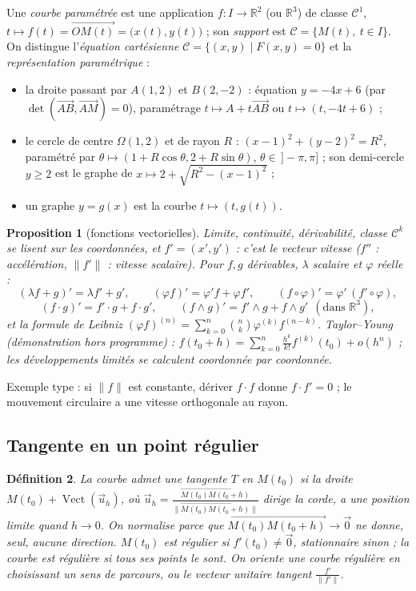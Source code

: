 \documentclass[a4paper,11pt]{article}
\numberwithin{equation}{section}
\numberwithin{figure}{section}
\numberwithin{table}{section}
\theoremstyle{enonce}
\newtheorem{definition}{Définition}[section]
\newtheorem{proposition}[definition]{Proposition}
\theoremstyle{exemple}
\theoremstyle{remarque}
\newcommand{\R}{\mathbb{R}}
\newcommand{\vect}{\operatorname{Vect}}
\newcommand{\vv}[1]{\overrightarrow{#1}}
\newcommand{\ve}[1]{\vec{#1}}
\begin{document}
Une \emph{courbe paramétrée} est une application $f:I\to\R^2$ (ou $\R^3$) de classe $\mathcal C^1$,
$t\mapsto f(t)=\vv{OM(t)}=\big(x(t),y(t)\big)$ ; son \emph{support} est $\mathcal C=\{M(t),\ t\in I\}$. On distingue
l'\emph{équation cartésienne} $\mathcal C=\{(x,y)\mid F(x,y)=0\}$ et la \emph{représentation paramétrique} :
\begin{itemize}
\item la droite passant par $A(1,2)$ et $B(2,-2)$ : équation $y=-4x+6$ (par $\det(\vv{AB},\vv{AM})=0$), paramétrage
      $t\mapsto A+t\vv{AB}$ ou $t\mapsto(t,-4t+6)$ ;
\item le cercle de centre $\Omega(1,2)$ et de rayon $R$ : $(x-1)^2+(y-2)^2=R^2$, paramétré par
      $\theta\mapsto(1+R\cos\theta,2+R\sin\theta)$, $\theta\in\,]-\pi,\pi]$ ; son demi-cercle $y\geq2$ est le graphe de
      $x\mapsto2+\sqrt{R^2-(x-1)^2}$ ;
\item un graphe $y=g(x)$ est la courbe $t\mapsto(t,g(t))$.
\end{itemize}

\begin{proposition}[fonctions vectorielles]\label{prop:fv}
Limite, continuité, dérivabilité, classe $\mathcal C^k$ se lisent \emph{sur les coordonnées}, et $f'=(x',y')$ : c'est le
vecteur vitesse ($f''$ : accélération, $\|f'\|$ : vitesse scalaire). Pour $f,g$ dérivables, $\lambda$ scalaire et $\varphi$
réelle :
\[(\lambda f+g)'=\lambda f'+g',\qquad(\varphi f)'=\varphi'f+\varphi f',\qquad(f\circ\varphi)'=\varphi'\,(f'\circ\varphi),\]
\[(f\cdot g)'=f'\cdot g+f\cdot g',\qquad(f\wedge g)'=f'\wedge g+f\wedge g'\ \ (\text{dans }\R^3),\]
et la formule de Leibniz $(\varphi f)^{(n)}=\sum_{k=0}^n\binom nk\varphi^{(k)}f^{(n-k)}$. Taylor--Young (démonstration hors
programme) : $f(t_0+h)=\sum_{k=0}^n\frac{h^k}{k!}f^{(k)}(t_0)+o(h^n)$ ; les développements limités se calculent coordonnée par
coordonnée.
\end{proposition}
Exemple type : si $\|f\|$ est constante, dériver $f\cdot f$ donne $f\cdot f'=0$ ; le mouvement circulaire a une vitesse
orthogonale au rayon.


\subsection{Tangente en un point régulier}

\begin{definition}
La courbe admet une tangente $T$ en $M(t_0)$ si la droite $M(t_0)+\vect(\ve u_h)$, où
$\ve u_h=\frac{\vv{M(t_0)M(t_0+h)}}{\|\vv{M(t_0)M(t_0+h)}\|}$ dirige la corde, a une position limite quand $h\to0$. On
normalise parce que $\vv{M(t_0)M(t_0+h)}\to\ve0$ ne donne, seul, aucune direction. $M(t_0)$ est \emph{régulier} si
$f'(t_0)\neq\ve0$, \emph{stationnaire} sinon ; la courbe est \emph{régulière} si tous ses points le sont. On \emph{oriente} une
courbe régulière en choisissant un sens de parcours, ou le vecteur unitaire tangent $\frac{f'}{\|f'\|}$.
\end{definition}
\end{document}
